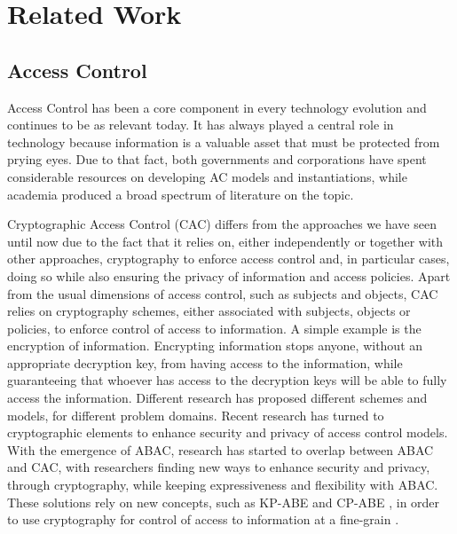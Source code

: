 \section{Related Work}
\label{chap:related}

\subsection{Access Control}
\label{sec:related-ac}

Access Control has been a core component in every technology evolution and continues to be as relevant today. It has always played a central role in technology because information is a valuable asset that must be protected from prying eyes. Due to that fact, both governments and corporations have spent considerable resources on developing AC models and instantiations, while academia produced a broad spectrum of literature on the topic.

Cryptographic Access Control (CAC) differs from the approaches we have seen until now due to the fact that it relies on, either independently or together with other approaches, cryptography to enforce access control and, in particular cases, doing so while also ensuring the privacy of information and access policies. Apart from the usual dimensions of access control, such as subjects and objects, CAC relies on cryptography schemes, either associated with subjects, objects or policies, to enforce control of access to information. A simple example is the encryption of information. Encrypting information stops anyone, without an appropriate decryption key, from having access to the information, while guaranteeing that whoever has access to the decryption keys will be able to fully access the information. Different research has proposed different schemes and models, for different problem domains. Recent research has turned to cryptographic elements to enhance security and privacy of access control models. With the emergence of ABAC, research has started to overlap between ABAC and CAC, with researchers finding new ways to enhance security and privacy, through cryptography, while keeping expressiveness and flexibility with ABAC. These solutions rely on new concepts, such as KP-ABE \cite{goyal_attribute-based_2006} and CP-ABE \cite{bethencourt_ciphertext-policy_2007}, in order to use cryptography for control of access to information at a fine-grain \cite{wan_hasbe:_2012, ruj_privacy_2012, wang_hierarchical_2010}.

